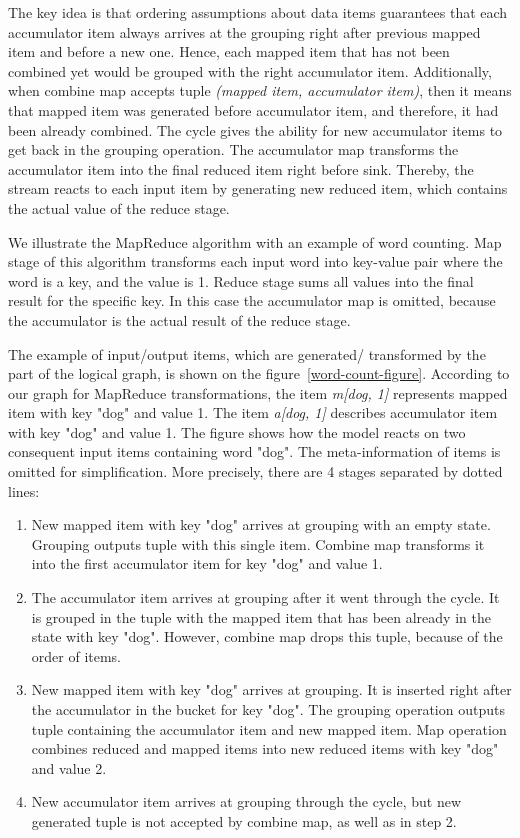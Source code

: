 The key idea is that ordering assumptions about data items guarantees that each accumulator item always arrives at the grouping right after previous mapped item and before a new one. Hence, each mapped item that has not been combined yet would be grouped with the right accumulator item. Additionally, when combine map accepts tuple {\it (mapped item, accumulator item)}, then it means that mapped item was generated before accumulator item, and therefore, it had been already combined. The cycle gives the ability for new accumulator items to get back in the grouping operation. The accumulator map transforms the accumulator item into the final reduced item right before sink. Thereby, the stream reacts to each input item by generating new reduced item, which contains the actual value of the reduce stage.

We illustrate the MapReduce algorithm with an example of word counting. Map stage of this algorithm transforms each input word into key-value pair where the word is a key, and the value is 1. Reduce stage sums all values into the final result for the specific key. In this case the accumulator map is omitted, because the accumulator is the actual result of the reduce stage.

The example of input/output items, which are generated/ transformed by the part of the logical graph, is shown on the figure~\ref {word-count-figure}. According to our graph for MapReduce transformations, the item {\it m[dog, 1]} represents mapped item with key "dog" and value 1. The item {\it a[dog, 1]} describes accumulator item with key "dog" and value 1. The figure shows how the model reacts on two consequent input items containing word "dog". The meta-information of items is omitted for simplification. More precisely, there are 4 stages separated by dotted lines:

\begin{enumerate}
    \item New mapped item with key "dog" arrives at grouping with an empty state. Grouping outputs tuple with this single item. Combine map transforms it into the first accumulator item for key "dog" and value 1.
    \item The accumulator item arrives at grouping after it went through the cycle. It is grouped in the tuple with the mapped item that has been already in the state with key "dog". However, combine map drops this tuple, because of the order of items.
    \item New mapped item with key "dog" arrives at grouping. It is inserted right after the accumulator in the bucket for key "dog". The grouping operation outputs tuple containing the accumulator item and new mapped item. Map operation combines reduced and mapped items into new reduced items with key "dog" and value 2.
    \item New accumulator item arrives at grouping through the cycle, but new generated tuple is not accepted by combine map, as well as in step 2.
\end{enumerate}

